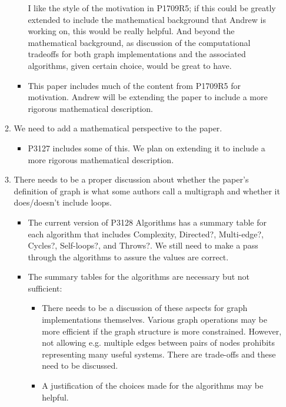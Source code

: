 \begin{itemize}
\begin{enumerate}
\begin{itemize}
                                    I like the style of the motivation in P1709R5; if this could be greatly extended to include the mathematical background that Andrew is 
                                    working on, this would be really helpful. And beyond the mathematical background, as discussion of the computational tradeoffs for 
                                    both graph implementations and the associated algorithms, given certain choice, would be great to have.
                              \item This paper includes much of the content from P1709R5 for motivation. Andrew will be extending the paper to include a more rigorous 
                                    mathematical description.
                        \end{itemize}
                  \item We need to add a mathematical perspective to the paper.
                        \begin{itemize}
                              \item P3127 includes some of this. We plan on extending it to include a more rigorous mathematical description.
                        \end{itemize}
                  \item There needs to be a proper discussion about whether the paper's definition of graph is what some authors call a multigraph 
                        and whether it does/doesn't include loops.
                        \begin{itemize}
                              \item The current version of P3128 Algorithms has a summary table for each algorithm that includes Complexity, Directed?, Multi-edge?, 
                                    Cycles?, Self-loops?, and Throws?. We still need to make a pass through the algorithms to assure the values are correct.
                              \item The summary tables for the algorithms are necessary but not sufficient: 
                                    \begin{itemize}
                                          \item There needs to be a discussion of these aspects for graph implementations themselves. Various graph operations may 
                                                be more efficient if the graph structure is more constrained. However, not allowing e.g. multiple edges between pairs 
                                                of nodes prohibits representing many useful systems. There are trade-offs and these need to be discussed.
                                          \item A justification of the choices made for the algorithms may be helpful.
                              \end{itemize}
                              

\end{itemize}
\end{enumerate}
\end{itemize}

